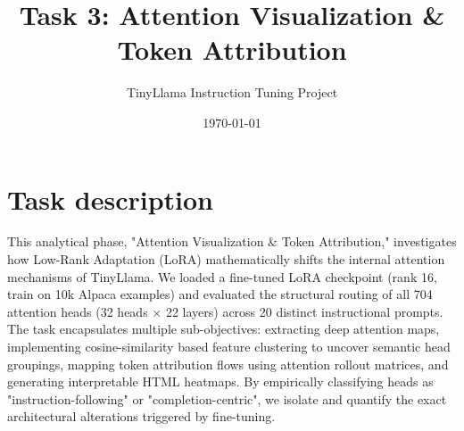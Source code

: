 \documentclass[10pt,a4paper]{article}
\title{\textbf{Task 3: Attention Visualization \& Token Attribution}}
\author{TinyLlama Instruction Tuning Project}
\date{\today}
\begin{document}
\maketitle
\vspace{-1em}

\section*{Task description}
This analytical phase, "Attention Visualization \& Token Attribution," investigates how Low-Rank Adaptation (LoRA) mathematically shifts the internal attention mechanisms of TinyLlama. We loaded a fine-tuned LoRA checkpoint (rank 16, train on 10k Alpaca examples) and evaluated the structural routing of all 704 attention heads (32 heads $\times$ 22 layers) across 20 distinct instructional prompts. The task encapsulates multiple sub-objectives: extracting deep attention maps, implementing cosine-similarity based feature clustering to uncover semantic head groupings, mapping token attribution flows using attention rollout matrices, and generating interpretable HTML heatmaps. By empirically classifying heads as "instruction-following" or "completion-centric", we isolate and quantify the exact architectural alterations triggered by fine-tuning.
\end{document}
